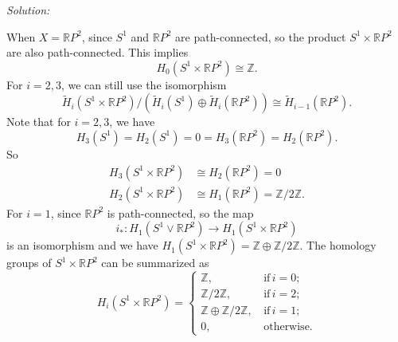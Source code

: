 \documentclass[a4paper, 12pt]{article}
\newenvironment{solution}
    {\textit{Solution:}}
    {}
\begin{document}
\begin{solution}
\begin{enumerate}[(a)]
When \(X=\mathbb{R}P^2\), since \(S^1\) and \(\mathbb{R}P^2\) are path-connected, so the product \(S^1\times \mathbb{R}P^2\) are also path-connected. This implies 
\[H_0(S^1\times \mathbb{R}P^2)\cong \mathbb{Z}.\]
For \(i=2,3\), we can still use the isomorphism 
\[\tilde{H}_i(S^1\times \mathbb{R}P^2)/(\tilde{H}_i(S^1)\oplus \tilde{H}_i(\mathbb{R}P^2))\cong \tilde{H}_{i-1}(\mathbb{R}P^2).\]
Note that for \(i=2,3\), we have 
\[H_3(S^1)=H_2(S^1)=0=H_3(\mathbb{R}P^2)=H_2(\mathbb{R}P^2).\]
So 
\begin{align*}
H_3(S^1\times \mathbb{R}P^2)&\cong H_2(\mathbb{R}P^2)=0\\ 
H_2(S^1\times \mathbb{R}P^2)&\cong H_1(\mathbb{R}P^2)=\mathbb{Z}/2 \mathbb{Z}.
\end{align*}
For \(i=1\), since \(\mathbb{R}P^2\) is path-connected, so the map 
\[i_*:H_1(S^1\vee \mathbb{R}P^2)\rightarrow H_1(S^1\times \mathbb{R}P^2)\]
is an isomorphism and we have \(H_1(S^1\times \mathbb{R}P^2)=\mathbb{Z}\oplus \mathbb{Z}/2 \mathbb{Z}\). The homology groups of \(S^1\times \mathbb{R}P^2\) can be summarized as 
\[H_i(S^1\times \mathbb{R}P^2)=\begin{cases}
    \mathbb{Z},&\, \text{if}\, i=0;\\ 
    \mathbb{Z}/2 \mathbb{Z},&\, \text{if}\, i=2;\\ 
    \mathbb{Z}\oplus \mathbb{Z}/2 \mathbb{Z},&\, \text{if}\, i=1;\\ 
    0,&\, \text{otherwise}.
\end{cases}\]
\end{enumerate}
\end{solution}
\end{document}
